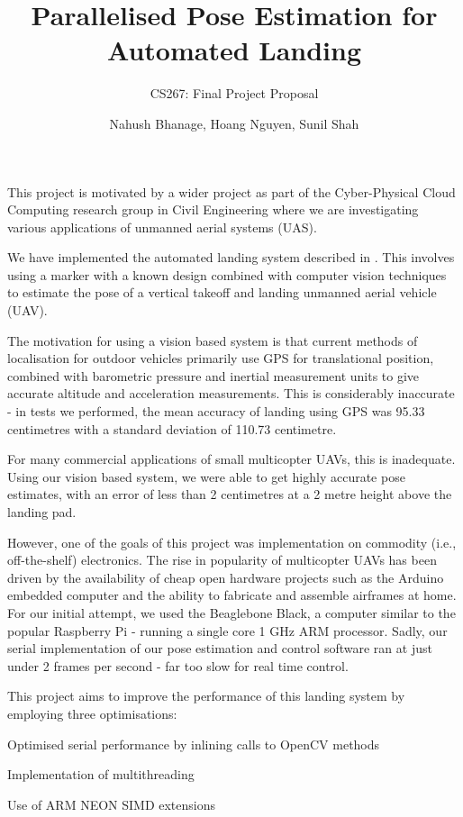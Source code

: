 \documentclass[10pt, twocolumn]{scrartcl} %
\title{Parallelised Pose Estimation for Automated Landing}
\subtitle{CS267: Final Project Proposal}
\author{Nahush Bhanage, Hoang Nguyen, Sunil Shah}
\date{}
\begin{document}
\maketitle
This project is motivated by a wider project as part of the Cyber-Physical Cloud Computing research group in Civil Engineering where we are investigating various applications of unmanned aerial systems (UAS). 

We have implemented the automated landing system described in \cite{sharp2001vision}. This involves using a marker with a known design combined with computer vision techniques to estimate the pose of a vertical takeoff and landing unmanned aerial vehicle (UAV). 

The motivation for using a vision based system is that current methods of localisation for outdoor vehicles primarily use GPS for translational position, combined with barometric pressure and inertial measurement units to give accurate altitude and acceleration measurements. This is considerably inaccurate - in tests we performed, the mean accuracy of landing using GPS was 95.33 centimetres with a standard deviation of 110.73 centimetre. 

For many commercial applications of small multicopter UAVs, this is inadequate. Using our vision based system, we were able to get highly accurate pose estimates, with an error of less than 2 centimetres at a 2 metre height above the landing pad.

However, one of the goals of this project was implementation on commodity (i.e., off-the-shelf) electronics. The rise in popularity of multicopter UAVs has been driven by the availability of cheap open hardware projects such as the Arduino embedded computer and the ability to fabricate and assemble airframes at home. For our initial attempt, we used the Beaglebone Black, a computer similar to the popular Raspberry Pi - running a single core 1 GHz ARM processor. Sadly, our serial implementation of our pose estimation and control software ran at just under 2 frames per second - far too slow for real time control.

This project aims to improve the performance of this landing system by employing three optimisations:
\begin{compactenum}
\item{Optimised serial performance by inlining calls to OpenCV methods}
\item{Implementation of multithreading}
\item{Use of ARM NEON SIMD extensions}
\end{compactenum}
\end{document}
